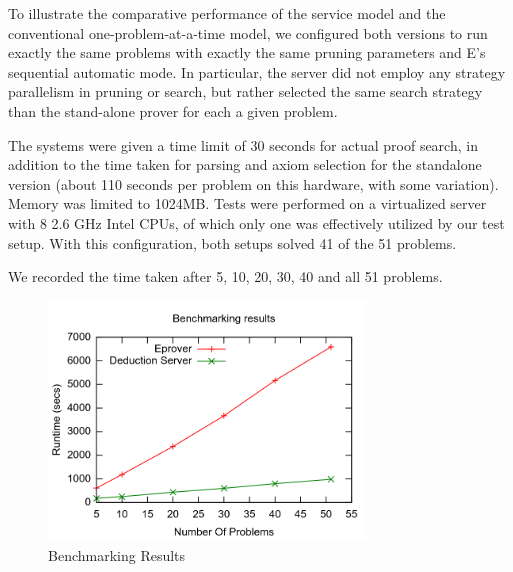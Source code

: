 \documentclass{article}
\begin{document}
To illustrate the comparative performance of the service model and the
conventional one-problem-at-a-time model, we configured both versions
to run exactly the same problems with exactly the same pruning
parameters and E's sequential automatic mode. In particular, the
server did not employ any strategy parallelism in pruning or search,
but rather selected the same search strategy than the stand-alone
prover for each a given problem.

The systems were given a time limit of 30 seconds for actual proof
search, in addition to the time taken for parsing and axiom selection
for the standalone version (about 110 seconds per problem on this
hardware, with some variation). Memory was limited to 1024MB. Tests
were performed on a virtualized server with 8 2.6 GHz Intel CPUs, of
which only one was effectively utilized by our test setup. With this
configuration, both setups solved 41 of the 51 problems.

We recorded the time taken after 5, 10, 20, 30, 40 and all 51
problems.

\begin{figure}[ht!]
  \centering
  \includegraphics[width=0.75\textwidth]{imgs/BenchmarkingResults.png}
  \caption{Benchmarking Results\label{benchmarking_results}}
\end{figure}
\end{document}
